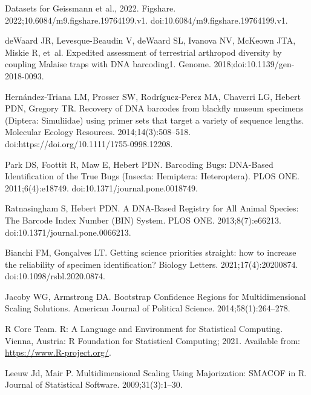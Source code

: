 \documentclass[12pt]{article}
\begin{document}
\begin{thebibliography}{10}
	Datasets for {Geissmann} et al., 2022.
	\newblock Figshare. 2022;10.6084/m9.figshare.19764199.v1.
	\newblock doi:{10.6084/m9.figshare.19764199.v1}.
	
	deWaard JR, Levesque-Beaudin V, deWaard SL, Ivanova NV, McKeown JTA, Miskie R,
	et~al.
	\newblock Expedited assessment of terrestrial arthropod diversity by coupling
	{Malaise} traps with {DNA} barcoding1.
	\newblock Genome. 2018;doi:{10.1139/gen-2018-0093}.
	
	Hernández‐Triana LM, Prosser SW, Rodríguez‐Perez MA, Chaverri LG, Hebert
	PDN, Gregory TR.
	\newblock Recovery of {DNA} barcodes from blackfly museum specimens ({Diptera}:
	{Simuliidae}) using primer sets that target a variety of sequence lengths.
	\newblock Molecular Ecology Resources. 2014;14(3):508--518.
	\newblock doi:{https://doi.org/10.1111/1755-0998.12208}.
	
	Park DS, Foottit R, Maw E, Hebert PDN.
	\newblock Barcoding {Bugs}: {DNA}-{Based} {Identification} of the {True} {Bugs}
	({Insecta}: {Hemiptera}: {Heteroptera}).
	\newblock PLOS ONE. 2011;6(4):e18749.
	\newblock doi:{10.1371/journal.pone.0018749}.
	
	Ratnasingham S, Hebert PDN.
	\newblock A {DNA}-{Based} {Registry} for {All} {Animal} {Species}: {The}
	{Barcode} {Index} {Number} ({BIN}) {System}.
	\newblock PLOS ONE. 2013;8(7):e66213.
	\newblock doi:{10.1371/journal.pone.0066213}.
	
	Bianchi FM, Gonçalves LT.
	\newblock Getting science priorities straight: how to increase the reliability
	of specimen identification?
	\newblock Biology Letters. 2021;17(4):20200874.
	\newblock doi:{10.1098/rsbl.2020.0874}.
	
	Jacoby WG, Armstrong DA.
	\newblock Bootstrap {Confidence} {Regions} for {Multidimensional} {Scaling}
	{Solutions}.
	\newblock American Journal of Political Science. 2014;58(1):264--278.
	
	{R Core Team}.
	\newblock R: {A} {Language} and {Environment} for {Statistical} {Computing}.
	\newblock Vienna, Austria: R Foundation for Statistical Computing; 2021.
	\newblock Available from: \url{https://www.R-project.org/}.
	
	Leeuw Jd, Mair P.
	\newblock Multidimensional {Scaling} {Using} {Majorization}: {SMACOF} in {R}.
	\newblock Journal of Statistical Software. 2009;31(3):1--30.
	

\end{thebibliography}
\end{document}
